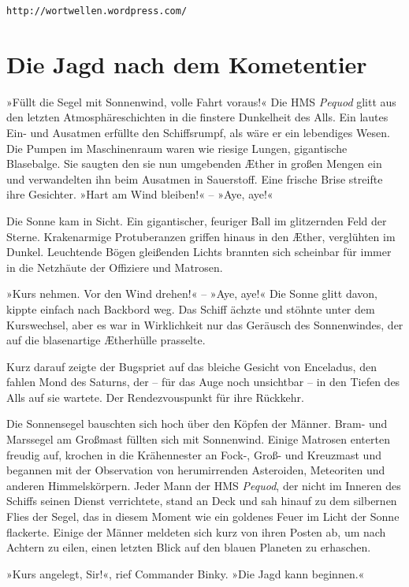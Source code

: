 \texttt{http://wortwellen.wordpress.com/}

\newpage

\section{Die Jagd nach dem Kometentier}

»Füllt die Segel mit Sonnenwind, volle Fahrt voraus!« Die HMS
\textit{Pequod} glitt aus den letzten Atmosphäreschichten in die finstere
Dunkelheit des Alls. Ein lautes Ein- und Ausatmen erfüllte den
Schiffsrumpf, als wäre er ein lebendiges Wesen. Die Pumpen im
Maschinenraum waren wie riesige Lungen, gigantische Blasebalge. Sie
saugten den sie nun umgebenden Æther in großen Mengen ein und
verwandelten ihn beim Ausatmen in Sauerstoff. Eine frische Brise
streifte ihre Gesichter. »Hart am Wind bleiben!« – »Aye, aye!«

Die Sonne kam in Sicht. Ein gigantischer, feuriger Ball im
glitzernden Feld der Sterne. Krakenarmige Protuberanzen griffen
hinaus in den Æther, verglühten im Dunkel. Leuchtende Bögen
gleißenden Lichts brannten sich scheinbar für immer in die
Netzhäute der Offiziere und Matrosen.

»Kurs nehmen. Vor den Wind drehen!« – »Aye, aye!« Die Sonne glitt
davon, kippte einfach nach Backbord weg. Das Schiff ächzte und
stöhnte unter dem Kurswechsel, aber es war in Wirklichkeit nur das
Geräusch des Sonnenwindes, der auf die blasenartige Ætherhülle
prasselte.

Kurz darauf zeigte der Bugspriet auf das bleiche Gesicht von
Enceladus, den fahlen Mond des Saturns, der – für das Auge noch
unsichtbar – in den Tiefen des Alls auf sie wartete. Der
Rendezvouspunkt für ihre Rückkehr.

Die Sonnensegel bauschten sich hoch über den Köpfen der Männer.
Bram- und Marssegel am Großmast füllten sich mit Sonnenwind. Einige
Matrosen enterten freudig auf, krochen in die Krähennester an
Fock-, Groß- und Kreuzmast und begannen mit der Observation von
herumirrenden Asteroiden, Meteoriten und anderen Himmelskörpern.
Jeder Mann der HMS \textit{Pequod}, der nicht im Inneren des Schiffs seinen
Dienst verrichtete, stand an Deck und sah hinauf zu dem silbernen
Flies der Segel, das in diesem Moment wie ein goldenes Feuer im
Licht der Sonne flackerte. Einige der Männer meldeten sich kurz von
ihren Posten ab, um nach Achtern zu eilen, einen letzten Blick auf
den blauen Planeten zu erhaschen.

»Kurs angelegt, Sir!«, rief Commander Binky. »Die Jagd kann
beginnen.«

